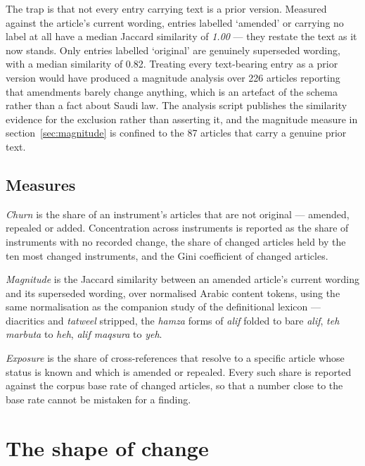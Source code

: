 \documentclass[11pt]{article}
\begin{document}
The trap is that not every entry carrying text is a prior version. Measured
against the article's current wording, entries labelled `amended' or carrying
no label at all have a median Jaccard similarity of \emph{1.00} --- they
restate the text as it now stands. Only entries labelled `original' are
genuinely superseded wording, with a median similarity of 0.82. Treating every
text-bearing entry as a prior version would have produced a magnitude analysis
over 226 articles reporting that amendments barely change anything, which is
an artefact of the schema rather than a fact about Saudi law. The analysis
script publishes the similarity evidence for the exclusion rather than
asserting it, and the magnitude measure in section~\ref{sec:magnitude} is
confined to the 87 articles that carry a genuine prior text.

\subsection{Measures}

\emph{Churn} is the share of an instrument's articles that are not original
--- amended, repealed or added. Concentration across instruments is reported
as the share of instruments with no recorded change, the share of changed
articles held by the ten most changed instruments, and the Gini coefficient of
changed articles.

\emph{Magnitude} is the Jaccard similarity between an amended article's
current wording and its superseded wording, over normalised Arabic content
tokens, using the same normalisation as the companion study of the
definitional lexicon --- diacritics and \emph{tatweel} stripped, the
\emph{hamza} forms of \emph{alif} folded to bare \emph{alif}, \emph{teh
marbuta} to \emph{heh}, \emph{alif maqsura} to \emph{yeh}.

\emph{Exposure} is the share of cross-references that resolve to a specific
article whose status is known and which is amended or repealed. Every such
share is reported against the corpus base rate of changed articles, so that a
number close to the base rate cannot be mistaken for a finding.

\section{The shape of change}
\end{document}
